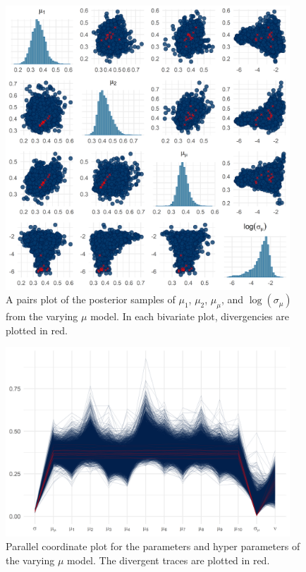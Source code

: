 \begin{figure}
   \centering
   \includegraphics[width=0.95\textwidth]{./figures/ch-5/plot-pp-mu-pairs.png}
   \caption{A pairs plot of the posterior samples of $\mu_1$, $\mu_2$, $\mu_\mu$, and $\log(\sigma_\mu)$ from the varying $\mu$ model. In each bivariate plot, divergencies are plotted in red.}
   \label{fig:pp_mu_pairs} 
\end{figure}

\begin{figure}
   \centering
   \includegraphics[width=0.95\textwidth]{./figures/ch-5/plot-pp-mu-parcoord.png}
   \caption{Parallel coordinate plot for the parameters and hyper parameters of the varying $\mu$ model. The divergent traces are plotted in red.}
   \label{fig:pp_mu_parcoord} 
\end{figure}

